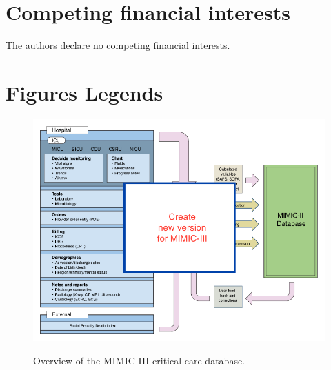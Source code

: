 \documentclass[english]{article}
\begin{document}
\section*{Competing financial interests}

The authors declare no competing financial interests.

\section*{Figures Legends}



\begin{center}
\begin{figure}
\caption{Overview of the MIMIC-III critical care database.}
\includegraphics[width=\textwidth]{mimic.png}
\label{fig:mimicoverview}
\end{figure}
\end{center}
\end{document}
